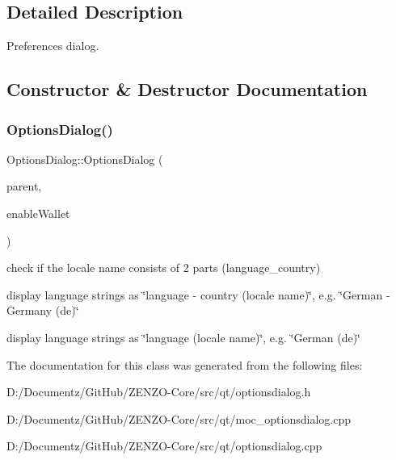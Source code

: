\subsection{Detailed Description}
Preferences dialog. 

\subsection{Constructor \& Destructor Documentation}
\mbox{\label{class_options_dialog_ac74fd1c2837d30f6687cb1898d99f8d1}} 
\subsubsection{\texorpdfstring{OptionsDialog()}{OptionsDialog()}}
{\footnotesize\ttfamily Options\+Dialog\+::\+Options\+Dialog (\begin{DoxyParamCaption}\item[{Q\+Widget $\ast$}]{parent,  }\item[{bool}]{enable\+Wallet }\end{DoxyParamCaption})\hspace{0.3cm}{\ttfamily [explicit]}}

check if the locale name consists of 2 parts (language\+\_\+country)

display language strings as \char`\"{}language -\/ country (locale name)\char`\"{}, e.\+g. \char`\"{}\+German -\/ Germany (de)\char`\"{}

display language strings as \char`\"{}language (locale name)\char`\"{}, e.\+g. \char`\"{}\+German (de)\char`\"{} 

The documentation for this class was generated from the following files\+:\begin{DoxyCompactItemize}
\item 
D\+:/\+Documentz/\+Git\+Hub/\+Z\+E\+N\+Z\+O-\/\+Core/src/qt/optionsdialog.\+h\item 
D\+:/\+Documentz/\+Git\+Hub/\+Z\+E\+N\+Z\+O-\/\+Core/src/qt/moc\+\_\+optionsdialog.\+cpp\item 
D\+:/\+Documentz/\+Git\+Hub/\+Z\+E\+N\+Z\+O-\/\+Core/src/qt/optionsdialog.\+cpp\end{DoxyCompactItemize}
